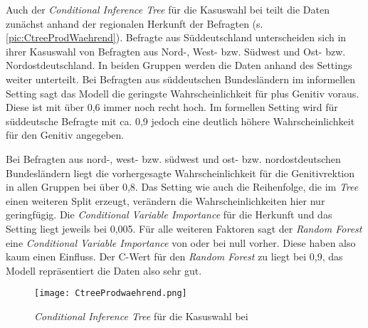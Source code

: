 Auch der \textit{Conditional Inference Tree} für die Kasuswahl bei \waehrend{} teilt die Daten zunächst anhand der regionalen Herkunft der Befragten (s. \autoref{pic:CtreeProdWaehrend}). 
Befragte aus Süddeutschland unterscheiden sich in ihrer Kasuswahl von Befragten aus Nord-, West- bzw. Südwest und Ost- bzw. Nordostdeutschland. 
In beiden Gruppen werden die Daten anhand des Settings weiter unterteilt. 
Bei Befragten aus süddeutschen Bundesländern im informellen Setting sagt das Modell die geringste Wahrscheinlichkeit für \waehrend{} plus Genitiv voraus.
Diese ist mit über 0,6 immer noch recht hoch. 
Im formellen Setting wird für süddeutsche Befragte mit ca. 0,9 jedoch eine deutlich höhere Wahrscheinlichkeit für den Genitiv angegeben. 

Bei Befragten aus nord-, west- bzw. südwest und ost- bzw. nordostdeutschen Bundesländern liegt die vorhergesagte Wahrscheinlichkeit für die Genitivrektion in allen Gruppen bei über 0,8. 
Das Setting wie auch die Reihenfolge, die im \textit{Tree} einen weiteren Split erzeugt, verändern die Wahrscheinlichkeiten hier nur geringfügig. 
Die \textit{Conditional Variable Importance} für die Herkunft und das Setting liegt jeweils bei 0,005. 
Für alle weiteren Faktoren sagt der \textit{Random Forest} eine \textit{Conditional Variable Importance} von oder bei null vorher. 
Diese haben also kaum einen Einfluss. 
Der C-Wert für den \textit{Random Forest} zu \waehrend{} liegt bei 0,9, das Modell repräsentiert die Daten also sehr gut. 
\begin{figure}
\centering
\texttt{[image: CtreeProdwaehrend.png]}
\caption{\textit{Conditional Inference Tree} für die Kasuswahl bei \waehrend}
\label{pic:CtreeProdWaehrend}
\end{figure}
%

